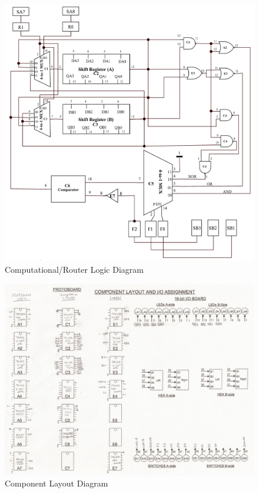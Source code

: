 \documentclass[journal, twocolumn, final,11pt,letterpaper]{IEEEtran}
\begin{document}
\begin{figure} [htbp]
 	\centering
 	\includegraphics[scale=0.55]{Computational_Router_Logic.png}
 	\caption{Computational/Router Logic Diagram\label{fig:computational-router-logic-diagram}}
\end{figure}

\begin{figure} [htbp]
	\centering
	\includegraphics[scale=0.55]{Component_Layout.png}
	\caption{Component Layout Diagram\label{fig:component-layout}}
\end{figure}



\end{document}
